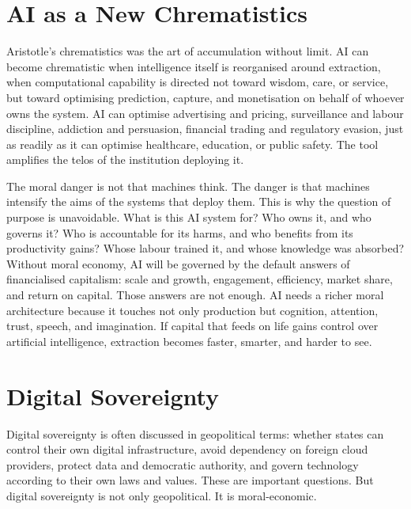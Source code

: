 \documentclass[11pt,a4paper,oneside]{book}
\begin{document}
\section*{AI as a New Chrematistics}

Aristotle's chrematistics was the art of accumulation without limit. AI can become chrematistic when intelligence itself is reorganised around extraction, when computational capability is directed not toward wisdom, care, or service, but toward optimising prediction, capture, and monetisation on behalf of whoever owns the system. AI can optimise advertising and pricing, surveillance and labour discipline, addiction and persuasion, financial trading and regulatory evasion, just as readily as it can optimise healthcare, education, or public safety. The tool amplifies the telos of the institution deploying it.

The moral danger is not that machines think. The danger is that machines intensify the aims of the systems that deploy them. This is why the question of purpose is unavoidable. What is this AI system for? Who owns it, and who governs it? Who is accountable for its harms, and who benefits from its productivity gains? Whose labour trained it, and whose knowledge was absorbed? Without moral economy, AI will be governed by the default answers of financialised capitalism: scale and growth, engagement, efficiency, market share, and return on capital. Those answers are not enough. AI needs a richer moral architecture because it touches not only production but cognition, attention, trust, speech, and imagination. If capital that feeds on life gains control over artificial intelligence, extraction becomes faster, smarter, and harder to see.

\section*{Digital Sovereignty}

Digital sovereignty is often discussed in geopolitical terms: whether states can control their own digital infrastructure, avoid dependency on foreign cloud providers, protect data and democratic authority, and govern technology according to their own laws and values. These are important questions. But digital sovereignty is not only geopolitical. It is moral-economic.
\end{document}
